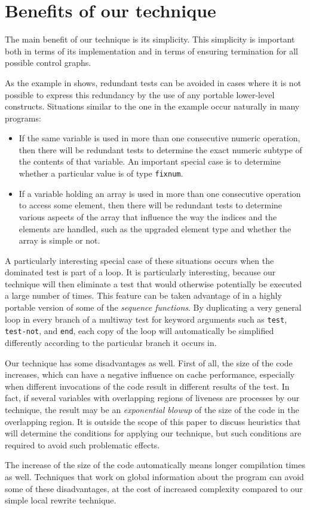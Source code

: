\section{Benefits of our technique}

The main benefit of our technique is its simplicity.  This simplicity
is important both in terms of its implementation and in terms of
ensuring termination for all possible control graphs.

As the example in  shows, redundant
tests can be avoided in cases where it is not possible to express this
redundancy by the use of any portable lower-level constructs.
Situations similar to the one in the example occur naturally in many
programs:

\begin{itemize}
\item If the same variable is used in more than one consecutive
  numeric operation, then there will be redundant tests to determine
  the exact numeric subtype of the contents of that variable.  An
  important special case is to determine whether a particular value is
  of type \texttt{fixnum}.
\item If a variable holding an array is used in more than one
  consecutive operation to access some element, then there will be
  redundant tests to determine various aspects of the array that
  influence the way the indices and the elements are handled, such as
  the upgraded element type and whether the array is simple or not.
\end{itemize}

A particularly interesting special case of these situations occurs
when the dominated test is part of a loop.  It is particularly
interesting, because our technique will then eliminate a test that
would otherwise potentially be executed a large number of times.  This
feature can be taken advantage of in a highly portable version of some
of the \commonlisp{} \emph{sequence functions}.  By duplicating a very
general loop in every branch of a multiway test for keyword arguments
such as \texttt{test}, \texttt{test-not}, and \texttt{end}, each copy
of the loop will automatically be simplified differently according to
the particular branch it occurs in.

Our technique has some disadvantages as well.  First of all, the size
of the code increases, which can have a negative influence on cache
performance, especially when different invocations of the code result
in different results of the test.  In fact, if several variables with
overlapping regions of liveness are processes by our technique, the
result may be an \emph{exponential blowup} of the size of the code in
the overlapping region.  It is outside the scope of this paper to
discuss heuristics that will determine the conditions for applying our
technique, but such conditions are required to avoid such problematic
effects.

The increase of the size of the code automatically means longer
compilation times as well.  Techniques that work on global information
about the program can avoid some of these disadvantages, at the cost
of increased complexity compared to our simple local rewrite
technique.
